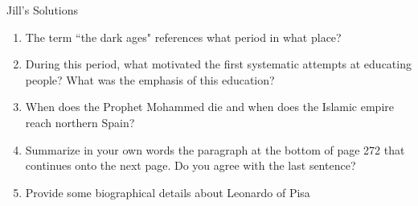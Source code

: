\documentclass[12pt]{article}
\begin{document}
Jill's Solutions
\begin{enumerate}
\item The term ``the dark ages" references what period in what place?\\
\vfill
\item During this period, what motivated the first systematic attempts at educating people? What was the emphasis of this education?\\
\vfill

\item When does the Prophet Mohammed die and when does the Islamic empire reach northern Spain?\\
\vfill
 \item Summarize in your own words the paragraph at the bottom of page 272 that continues onto the next page. Do you agree with the last sentence?\\
\vfill
\item Provide some biographical details about Leonardo of Pisa\\
\vfill
 \end{enumerate}
\end{document}
